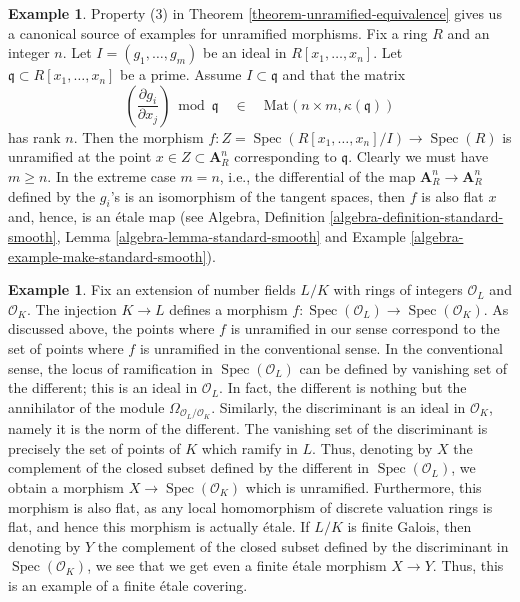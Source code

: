 \documentclass{stacks-project}
\theoremstyle{plain}
\theoremstyle{definition}
\newtheorem{example}[subsection]{Example}
\theoremstyle{remark}
\numberwithin{equation}{subsection}
\def\Spec{\mathop{\mathrm{Spec}}}
\begin{document}
\begin{example}
\label{example-standard-etale}
Property (3) in
Theorem \ref{theorem-unramified-equivalence}
gives us a canonical source of examples for unramified morphisms.
Fix a ring $R$ and an integer $n$. Let $I = (g_1, \ldots, g_m)$ be an
ideal in $R[x_1, \ldots, x_n]$. Let $\mathfrak q \subset R[x_1, \ldots, x_n]$
be a prime. Assume $I \subset \mathfrak q$ and that the matrix
$$
\left(\frac{\partial g_i}{\partial x_j}\right) \bmod \mathfrak q
\quad\in\quad
\text{Mat}(n \times m, \kappa(\mathfrak q))
$$
has rank $n$. Then the morphism
$f : Z = \Spec(R[x_1, \ldots, x_n]/I) \to \Spec(R)$
is unramified at the point $x \in Z \subset \mathbf{A}^n_R$ corresponding
to $\mathfrak q$. Clearly we must have $m \geq n$.
In the extreme case $m = n$, i.e., the differential of the map
$\mathbf{A}^n_R \to \mathbf{A}^n_R$ defined by the $g_i$'s
is an isomorphism of the tangent spaces, then $f$ is also flat
$x$ and, hence, is an \'etale map (see Algebra,
Definition \ref{algebra-definition-standard-smooth},
Lemma \ref{algebra-lemma-standard-smooth} and
Example \ref{algebra-example-make-standard-smooth}).
\end{example}

\begin{example}
\label{example-number-theory-etale}
Fix an extension of number fields $L/K$ with rings of integers
$\mathcal{O}_L$ and $\mathcal{O}_K$. The injection $K \to L$ defines a
morphism $f : \Spec(\mathcal{O}_L) \to \Spec(\mathcal{O}_K)$.
As discussed above, the points where $f$ is unramified in our sense
correspond to the set of points where $f$ is unramified in the conventional
sense. In the conventional sense, the locus of ramification in
$\Spec(\mathcal{O}_L)$ can be defined by vanishing set of the
different; this is an ideal in $\mathcal{O}_L$. In fact, the different is
nothing but the annihilator of the module
$\Omega_{\mathcal{O}_L/\mathcal{O}_K}$. Similarly, the
discriminant is an ideal in $\mathcal{O}_K$, namely it is the
norm of the different.
The vanishing set of the discriminant is precisely the set
of points of $K$ which ramify in $L$.
Thus, denoting by $X$ the complement of the closed subset
defined by the different in $\Spec(\mathcal{O}_L)$,
we obtain a morphism $X \to \Spec(\mathcal{O}_K)$ which is unramified.
Furthermore, this morphism is also flat, as any local homomorphism
of discrete valuation rings is flat, and hence this morphism is
actually \'etale. If $L/K$ is finite Galois, then denoting by
$Y$ the complement of the closed subset defined by the discriminant in
$\Spec(\mathcal{O}_K)$, we see that we get even a
finite \'etale morphism $X \to Y$.
Thus, this is an example of a finite \'etale covering.
\end{example}
\end{document}
